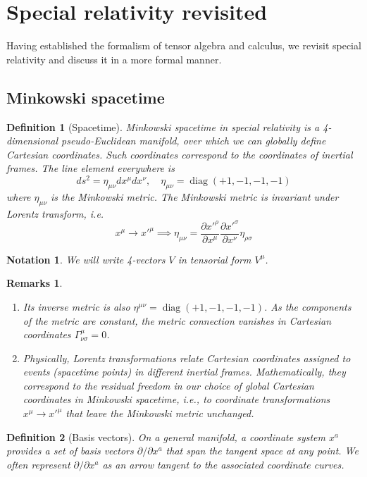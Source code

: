 \documentclass[a4paper]{article}
\DeclareMathOperator{\diag}{diag}
\newtheorem{remarks}{Remarks}[section]
\newtheorem{notation}{Notation}[section]
\theoremstyle{new}
\newtheorem{defi}{Definition}[section]
\begin{document}
\section{Special relativity revisited}
Having established the formalism of tensor algebra and calculus, we revisit special relativity and discuss it in a more formal manner.
\subsection{Minkowski spacetime}
\begin{defi}[Spacetime]
Minkowski spacetime in special relativity is a 4-dimensional pseudo-Euclidean manifold, over which we can globally define Cartesian coordinates. Such coordinates correspond to the coordinates of inertial frames. The line element everywhere is
$$ds^2=\eta_{\mu\nu}dx^\mu dx^\nu,\quad\eta_{\mu\nu}=\diag(+1,-1,-1,-1)$$
where $\eta_{\mu\nu}$ is the Minkowski metric. The Minkowski metric is invariant under Lorentz transform, i.e. 
$$x^\mu\rightarrow x'^\mu\implies\eta_{\mu\nu}=\frac{\partial x'^\rho}{\partial x^\mu}\frac{\partial x'^\sigma}{\partial x^\nu}\eta_{\rho\sigma} $$
\end{defi}
\begin{notation}
We will write 4-vectors $V$ in tensorial form $V^\mu$.
\end{notation}
\begin{remarks}\leavevmode
\begin{enumerate}
\item Its inverse metric is also $\eta^{\mu\nu}=\diag(+1,-1,-1,-1)$. As the components of the metric are constant, the metric connection vanishes in Cartesian coordinates $\Gamma^\mu_{\nu\sigma}=0$.
\item Physically, Lorentz transformations relate Cartesian coordinates assigned to events (spacetime points) in different inertial frames. Mathematically, they correspond to the residual freedom in our choice of global Cartesian coordinates in Minkowski spacetime, i.e., to coordinate transformations $x^\mu\rightarrow x'^\mu$ that leave the Minkowski metric unchanged.
\end{enumerate}
\end{remarks}
\begin{defi}[Basis vectors]
On a general manifold, a coordinate system $x^a$ provides a set of basis vectors $\partial/\partial x^a$ that span the tangent space at any point. We often represent $\partial/\partial x^a$ as an arrow tangent to the associated coordinate curves.
\end{defi}
\end{document}
